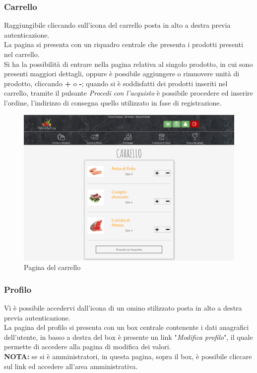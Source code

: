 	\subsubsection{Carrello}
	Raggiungibile cliccando sull'icona del carrello posta in alto a destra previa autenticazione.\\
	La pagina si presenta con un riquadro centrale che presenta i prodotti presenti nel carrello.\\
	Si ha la possibilità di entrare nella pagina relativa al singolo prodotto, in cui sono presenti maggiori dettagli, oppure è possibile aggiungere o rimuovere unità di prodotto, cliccando \textbf{+} o \textbf{-}; quando si è soddisfatti dei prodotti inseriti nel carrello, tramite il pulsante \textit{Procedi con l'acquisto} è possibile procedere ed inserire l'ordine, l'indirizzo di consegna quello utilizzato in fase di registrazione.
	\begin{figure}[H]
		\includegraphics[width=\linewidth]{res/img/carrello}
		\caption{Pagina del carrello}
		\label{Carrello}
	\end{figure}
	\subsubsection{Profilo}
	Vi è possibile accedervi dall'icona di un omino stilizzato posta in alto a destra previa autenticazione.\\
	La pagina del profilo si presenta con un box centrale contenente i dati anagrafici dell'utente, in basso a destra del box è presente un link "\textit{Modifica profilo}", il quale permette di accedere alla pagina di modifica dei valori.\\
	\textbf{NOTA:} se si è amministratori, in questa pagina, sopra il box, è possibile cliccare sul link ed accedere all'area amministrativa.
	
